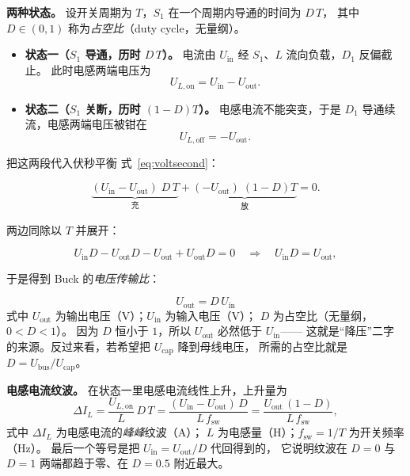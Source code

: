 \documentclass[cn,blue,11pt,device=normal]{elegantnote}
\newcommand{\fref}[1]{式~\eqref{#1}}
\begin{document}
\textbf{两种状态。} 设开关周期为 $T$，$S_1$ 在一个周期内导通的时间为 $D\,T$，
其中 $D\in(0,1)$ 称为\emph{占空比}（duty cycle，无量纲）。

\begin{itemize}
  \item \textbf{状态一（$S_1$ 导通，历时 $D\,T$）。}
  电流由 $U_{\mathrm{in}}$ 经 $S_1$、$L$ 流向负载，$D_1$ 反偏截止。
  此时电感两端电压为
  \begin{equation}\label{eq:buck-on}
    U_{L,\mathrm{on}} = U_{\mathrm{in}} - U_{\mathrm{out}} .
  \end{equation}
  \item \textbf{状态二（$S_1$ 关断，历时 $(1-D)T$）。}
  电感电流不能突变，于是 $D_1$ 导通续流，电感两端电压被钳在
  \begin{equation}\label{eq:buck-off}
    U_{L,\mathrm{off}} = -U_{\mathrm{out}} .
  \end{equation}
\end{itemize}

把这两段代入伏秒平衡 \fref{eq:voltsecond}：

\begin{equation}\label{eq:buckvs}
  \underbrace{(U_{\mathrm{in}}-U_{\mathrm{out}})\;D\,T}_{\text{充}}
  + \underbrace{(-U_{\mathrm{out}})\;(1-D)T}_{\text{放}} = 0 .
\end{equation}

两边同除以 $T$ 并展开：

\begin{equation}
  U_{\mathrm{in}}D - U_{\mathrm{out}}D - U_{\mathrm{out}} + U_{\mathrm{out}}D = 0
  \quad\Longrightarrow\quad
  U_{\mathrm{in}}D = U_{\mathrm{out}} ,
\end{equation}

于是得到 Buck 的\emph{电压传输比}：

\begin{equation}\label{eq:buckgain}
  \boxed{\;U_{\mathrm{out}} = D\,U_{\mathrm{in}}\;}
\end{equation}
式中 $U_{\mathrm{out}}$ 为输出电压（V）；$U_{\mathrm{in}}$ 为输入电压（V）；
$D$ 为占空比（无量纲，$0<D<1$）。
因为 $D$ 恒小于 $1$，所以 $U_{\mathrm{out}}$ 必然低于 $U_{\mathrm{in}}$——
这就是“降压”二字的来源。反过来看，若希望把 $U_{\mathrm{cap}}$ 降到母线电压，
所需的占空比就是 $D=U_{\mathrm{bus}}/U_{\mathrm{cap}}$。

\textbf{电感电流纹波。} 在状态一里电感电流线性上升，上升量为
\begin{equation}\label{eq:buckripple}
  \Delta I_L = \frac{U_{L,\mathrm{on}}}{L}\,D\,T
             = \frac{(U_{\mathrm{in}}-U_{\mathrm{out}})\,D}{L\,f_{\mathrm{sw}}}
             = \frac{U_{\mathrm{out}}\,(1-D)}{L\,f_{\mathrm{sw}}} ,
\end{equation}
式中 $\Delta I_L$ 为电感电流的\emph{峰峰}纹波（A）；
$L$ 为电感量（H）；$f_{\mathrm{sw}}=1/T$ 为开关频率（Hz）。
最后一个等号是把 $U_{\mathrm{in}}=U_{\mathrm{out}}/D$ 代回得到的，
它说明纹波在 $D=0$ 与 $D=1$ 两端都趋于零、在 $D=0.5$ 附近最大。
\end{document}
